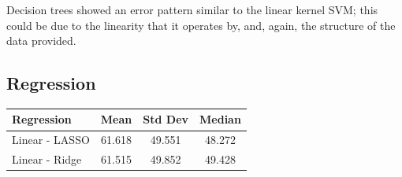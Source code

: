 \documentclass{article}
\begin{document}
Decision trees showed an error pattern similar to the linear kernel SVM; this could be due to the linearity that it operates by, and, again, the structure of the data provided. 

\subsection{Regression}

\begin{center}
\begin{tabular}{l|c|c|c}
Regression & Mean & Std Dev & Median\\
\hline
Linear - LASSO & 61.618 & 49.551 & 48.272 \\
Linear - Ridge & 61.515 & 49.852 & 49.428
\end{tabular}
\end{center}
\end{document}
